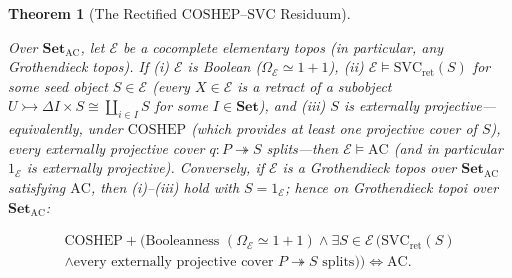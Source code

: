 \documentclass[10pt,twoside,openright]{book}
\theoremstyle{crmplain}
\newtheorem{theorem}{Theorem}[section]
\theoremstyle{crmdef}
\theoremstyle{crmremark}
\begin{document}
\begin{theorem}[The Rectified $\mathrm{COSHEP}$--$\mathrm{SVC}$ Residuum]\label{thm:coshep-svc}%
%

Over $\mathbf{Set}_{\mathrm{AC}}$, let $\mathcal{E}$ be a cocomplete elementary topos (in particular, any Grothendieck topos). If \textup{(i)} $\mathcal{E}$ is Boolean ($\Omega_{\mathcal{E}} \simeq 1+1$), \textup{(ii)} $\mathcal{E} \models \mathrm{SVC}_{\mathrm{ret}}(S)$ for some seed object $S \in \mathcal{E}$ (every $X \in \mathcal{E}$ is a retract of a subobject $U \rightarrowtail \Delta I \times S \cong \coprod_{i \in I} S$ for some $I \in \mathbf{Set}$), and \textup{(iii)} $S$ is externally projective---equivalently, under $\mathrm{COSHEP}$ (which provides at least one projective cover of $S$), every externally projective cover $q : P \twoheadrightarrow S$ splits---then $\mathcal{E} \models \mathrm{AC}$ (and in particular $1_{\mathcal{E}}$ is externally projective). Conversely, if $\mathcal{E}$ is a Grothendieck topos over $\mathbf{Set}_{\mathrm{AC}}$ satisfying $\mathrm{AC}$, then \textup{(i)}--\textup{(iii)} hold with $S = 1_{\mathcal{E}}$; hence on Grothendieck topoi over $\mathbf{Set}_{\mathrm{AC}}$:

\[
  \begin{gathered}
    \mathrm{COSHEP} + \bigl(\text{Booleanness } (\Omega_{\mathcal{E}} \simeq 1+1) \wedge \exists S \in \mathcal{E}\,\bigl(\mathrm{SVC}_{\mathrm{ret}}(S) \\
    \wedge \text{every externally projective cover } P \twoheadrightarrow S \text{ splits}\bigr)\bigr) \iff \mathrm{AC}.
  \end{gathered}
\]

\end{theorem}
\end{document}
